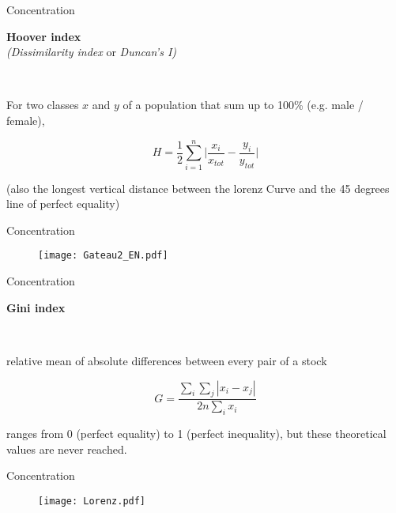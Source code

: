 \begin{frame}{Concentration}

\textbf{Hoover  index} \\
\emph{(Dissimilarity index} or \emph{Duncan's I)}

~

For two classes $x$ and $y$ of a population  that sum up to 100\% (e.g. male / female), 

\begin{equation}
\nonumber
H = \frac{1}{2} \sum_{i=1}^n \bigg| \frac{x_i}{x_{tot}} - \frac{y_i}{y_{tot}} \bigg|
\end{equation}


(also the longest vertical distance between the lorenz Curve and the 45 degrees line of perfect equality)

\end{frame}


\begin{frame}{Concentration}
\begin{figure}
\texttt{[image: Gateau2\_EN.pdf]}
\end{figure}

\end{frame}



\begin{frame}{Concentration}

\textbf{Gini index}

~

relative mean of absolute differences between every pair of a stock 

\begin{equation}
\nonumber
G = \frac{\sum_i \sum_j |x_i - x_j|}{2n \sum_i x_i}
\end{equation}


ranges from 0 (perfect equality) to 1 (perfect inequality), but these theoretical values are never reached.





\end{frame}	



\begin{frame}{Concentration}


\begin{figure}
\texttt{[image: Lorenz.pdf]}
\end{figure}

\end{frame}


